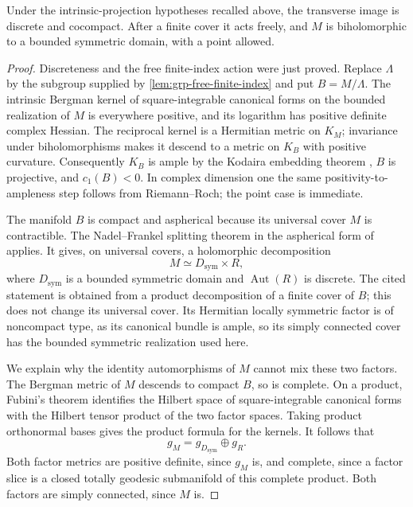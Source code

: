 \begin{theorem}\label{thm:grp-discrete-symmetric}
Under the intrinsic-projection hypotheses recalled above, the transverse image is discrete and cocompact.  After a finite cover it acts freely, and $M$ is biholomorphic to a bounded symmetric domain, with a point allowed.
\end{theorem}

\begin{proof}
Discreteness and the free finite-index action were just proved. Replace $\Lambda$ by the subgroup supplied by \cref{lem:grp-free-finite-index} and put $B=M/\Lambda$. The intrinsic Bergman kernel of square-integrable canonical forms on the bounded realization of $M$ is everywhere positive, and its logarithm has positive definite complex Hessian.  The reciprocal kernel is a Hermitian metric on $K_M$; invariance under biholomorphisms makes it descend to a metric on $K_B$ with positive curvature.  Consequently $K_B$ is ample by the Kodaira embedding theorem \cite[\S\S1--2; see also \S4]{Kodaira1954PNAS}, $B$ is projective, and $c_1(B)<0$. In complex dimension one the same positivity-to-ampleness step follows from Riemann--Roch; the point case is immediate.

The manifold $B$ is compact and aspherical because its universal cover $M$ is contractible.  The Nadel--Frankel splitting theorem in the aspherical form of \cite[Theorem~1.10]{FarbWeinberger2008} applies. It gives, on universal covers, a holomorphic decomposition
\[
 M\simeq D_{\mathrm{sym}}\times R,
\]
where $D_{\mathrm{sym}}$ is a bounded symmetric domain and $\operatorname{Aut}(R)$ is discrete.  The cited statement is obtained from a product decomposition of a finite cover of $B$; this does not change its universal cover.  Its Hermitian locally symmetric factor is of noncompact type, as its canonical bundle is ample, so its simply connected cover has the bounded symmetric realization used here.

We explain why the identity automorphisms of $M$ cannot mix these two factors.  The Bergman metric of $M$ descends to compact $B$, so is complete.  On a product, Fubini's theorem identifies the Hilbert space of square-integrable canonical forms with the Hilbert tensor product of the two factor spaces.  Taking product orthonormal bases gives the product formula for the kernels.  It follows that
\[
 g_M=g_{D_{\mathrm{sym}}}\oplus g_R.
\]
Both factor metrics are positive definite, since $g_M$ is, and complete, since a factor slice is a closed totally geodesic submanifold of this complete product.  Both factors are simply connected, since $M$ is.


\end{proof}
